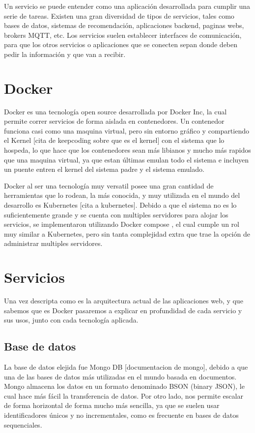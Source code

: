 Un servicio se puede entender como una aplicación desarrollada para cumplir una serie de tareas. Existen una gran diversidad de tipos de servicios, tales como bases de datos, sistemas de recomendación, aplicaciones backend, paginas webs, brokers MQTT, etc. Los servicios suelen establecer interfaces de comunicación, para que los otros servicios o aplicaciones que se conecten sepan donde deben pedir la información y que van a recibir.

\section{Docker}

Docker es una tecnología open source desarrollada por Docker Inc, la cual permite correr servicios de forma aislada en contenedores. Un contenedor funciona casi como una maquina virtual, pero sin entorno gráfico y compartiendo el Kernel [cita de keepcoding sobre que es el kernel] con el sistema que lo hospeda, lo que hace que los contenedores sean más libianos y mucho más rapidos que una maquina virtual, ya que estan últimas emulan todo el sistema e incluyen un puente entren el kernel del sistema padre y el sistema emulado.

Docker al ser una tecnología muy versatil posee una gran cantidad de herramientas que lo rodean, la más conocida, y muy utilizada en el mundo del desarrollo es Kubernetes [cita a kubernetes]. Debido a que el sistema no es lo suficientemente grande y se cuenta con multiples servidores para alojar los servicios, se implementaron utilizando Docker compose \cite{noauthor_docker_2023}, el cual cumple un rol muy similar a Kubernetes, pero sin tanta complejidad extra que trae la opción de administrar multiples servidores.

\section{Servicios}

Una vez descripta como es la arquitectura actual de las aplicaciones web, y que sabemos que es Docker pasaremos a explicar en profundidad de cada servicio y sus usos, junto con cada tecnología aplicada.

\subsection{Base de datos}

La base de datos elejida fue Mongo DB [documentacion de mongo], debido a que una de las bases de datos más utilizadas en el mundo basada en documentos. Mongo almacena los datos en un formato denominado BSON (binary JSON), le cual hace más fácil la transferencia de datos. Por otro lado, nos permite escalar de forma horizontal de forma mucho más sencilla, ya que se suelen usar identificadores únicos y no incrementales, como es frecuente en bases de datos sequenciales.

